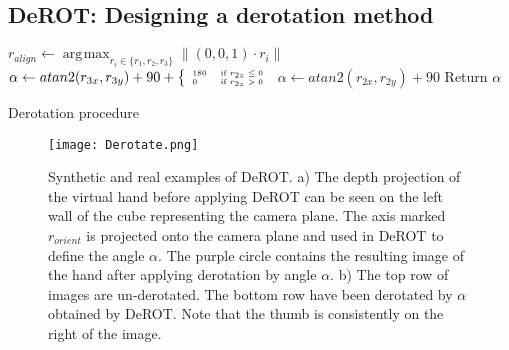 \documentclass{bmvc2k}
\DeclareMathOperator*{\argmax}{\arg\!\max}
\newcommand{\twopartdef}[4]{
	\left\{
		\begin{array}{ll}
			#1 & \mbox{if } #2 \\
			#3 & \mbox{if } #4
		\end{array}
	\right.
}
\begin{document}

\subsection{DeROT: Designing a derotation method}\label{sec:derot}

\begin{algorithm}[h]
\scriptsize
\begin{multicols}{2}
\begin{algorithmic}[1]
	\State $r_{align} \leftarrow \argmax_{r_i \in \{r_1,r_2,r_3\}} \|\left(0,0,1\right)\cdot r_i\|$
	   \State $\alpha \leftarrow atan2(r_{3x},r_{3y}) + 90 + \tiny \twopartdef {180} {r_{2z} \leq 0} {0} {r_{2z} > 0}$
	\Else
	   \State $\alpha \leftarrow atan2(r_{2x},r_{2y}) + 90$	   
	\EndIf
	\State Return $\alpha$
\EndProcedure
\end{algorithmic}


\caption{Derotation procedure}\label{alg:treebuilder}
\label{alg:derot}
\end{multicols}
\vspace*{-0.3cm}
\end{algorithm}


\begin{figure}[h]
\begin{center}
\texttt{[image: Derotate.png]}
\end{center}
   \caption{\scriptsize \color{blue} Synthetic and real examples of DeROT. a) The depth projection of the virtual hand before applying DeROT can be seen on the left wall of the cube representing the camera plane. The axis marked $r_{orient}$ is projected onto the camera plane and used in DeROT to define the angle $\alpha$. The purple circle contains the resulting image of the hand after applying derotation by angle $\alpha$. b) The top row of images are un-derotated. The bottom row have been derotated by $\alpha$ obtained by DeROT. Note that the thumb is consistently on the right of the image.}
\label{fig:derot}
\end{figure}
\end{document}
